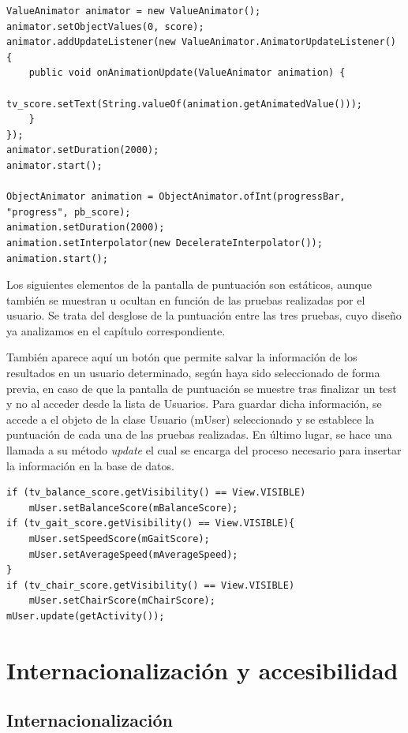 \begin{lstlisting}
ValueAnimator animator = new ValueAnimator();
animator.setObjectValues(0, score);
animator.addUpdateListener(new ValueAnimator.AnimatorUpdateListener() {
    public void onAnimationUpdate(ValueAnimator animation) {
        tv_score.setText(String.valueOf(animation.getAnimatedValue()));
    }
});
animator.setDuration(2000); 
animator.start();

ObjectAnimator animation = ObjectAnimator.ofInt(progressBar, "progress", pb_score);
animation.setDuration(2000);
animation.setInterpolator(new DecelerateInterpolator());
animation.start();
\end{lstlisting}

Los siguientes elementos de la pantalla de puntuación son estáticos, aunque también se muestran u ocultan en función de las pruebas realizadas por el usuario. Se trata del desglose de la puntuación entre las tres pruebas, cuyo diseño ya analizamos en el capítulo correspondiente.

También aparece aquí un botón que permite salvar la información de los resultados en un usuario determinado, según haya sido seleccionado de forma previa, en caso de que la pantalla de puntuación se muestre tras finalizar un test y no al acceder desde la lista de Usuarios. Para guardar dicha información, se accede a el objeto de la clase Usuario (mUser) seleccionado y se establece la puntuación de cada una de las pruebas realizadas. En último lugar, se hace una llamada a su método \textit{update} el cual se encarga del proceso necesario para insertar la información en la base de datos.

\begin{lstlisting}
if (tv_balance_score.getVisibility() == View.VISIBLE)
    mUser.setBalanceScore(mBalanceScore);
if (tv_gait_score.getVisibility() == View.VISIBLE){
    mUser.setSpeedScore(mGaitScore);
    mUser.setAverageSpeed(mAverageSpeed);
}
if (tv_chair_score.getVisibility() == View.VISIBLE)
    mUser.setChairScore(mChairScore);
mUser.update(getActivity());
\end{lstlisting}

\section{Internacionalización y accesibilidad}

\subsection{Internacionalización}

